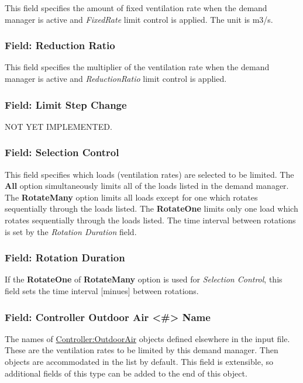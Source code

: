 This field specifies the amount of fixed ventilation rate when the demand manager is active and \emph{FixedRate} limit control is applied. The unit is m3/s.

\subsubsection{Field: Reduction Ratio}\label{field-reduction-ratio}

This field specifies the multiplier of the ventilation rate when the demand manager is active and \emph{ReductionRatio} limit control is applied.

\subsubsection{Field: Limit Step Change}\label{field-limit-step-change-3}

NOT YET IMPLEMENTED.

\subsubsection{Field: Selection Control}\label{field-selection-control-4}

This field specifies which loads (ventilation rates) are selected to be limited. The \textbf{All} option simultaneously limits all of the loads listed in the demand manager. The \textbf{RotateMany} option limits all loads except for one which rotates sequentially through the loads listed. The \textbf{RotateOne} limits only one load which rotates sequentially through the loads listed. The time interval between rotations is set by the \emph{Rotation Duration} field.

\subsubsection{Field: Rotation Duration}\label{field-rotation-duration-4}

If the \textbf{RotateOne} of \textbf{RotateMany} option is used for \emph{Selection Control}, this field sets the time interval {[}minues{]} between rotations.

\subsubsection{Field: Controller Outdoor Air \textless{}\#\textgreater{} Name}\label{field-controller-outdoor-air-x-name}

The names of \hyperref[controlleroutdoorair]{Controller:OutdoorAir} objects defined elsewhere in the input file. These are the ventilation rates to be limited by this demand manager. Then objects are accommodated in the list by default.  This field is extensible, so additional fields of this type can be added to the end of this object.

